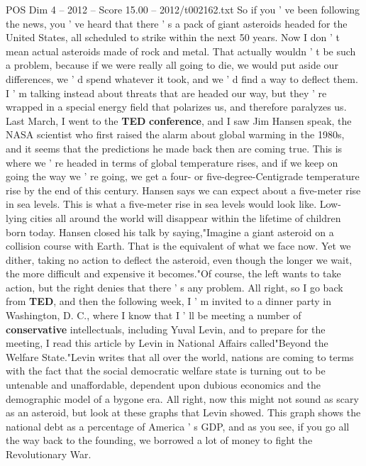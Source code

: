 \begin{textsample}{POS Dim 4 – 2012 – Score 15.00 – 2012/t002162.txt}  \label{ex:f4_pos_072}
So if you ' ve been following the news, you ' ve heard that there ' s a pack of giant asteroids headed for the United States, all scheduled to strike within the next 50 years.
Now I don ' t mean actual asteroids made of rock and metal.
That actually wouldn ' t be such a problem, because if we were really all going to die, we would put aside our differences, we ' d spend whatever it took, and we ' d find a way to deflect them.
I ' m talking instead about threats that are headed our way, but they ' re wrapped in a special energy field that polarizes us, and therefore paralyzes us.
Last March, I went to the \textbf{TED} \textbf{conference}, and I saw Jim Hansen speak, the NASA scientist who first raised the alarm about global warming in the 1980s, and it seems that the predictions he made back then are coming true.
This is where we ' re headed in terms of global temperature rises, and if we keep on going the way we ' re going, we get a four- or five-degree-Centigrade temperature rise by the end of this century.
Hansen says we can expect about a five-meter rise in sea levels.
This is what a five-meter rise in sea levels would look like.
Low- lying cities all around the world will disappear within the lifetime of children born today.
Hansen closed his talk by saying,"Imagine a giant asteroid on a collision course with Earth.
That is the equivalent of what we face now.
Yet we dither, taking no action to deflect the asteroid, even though the longer we wait, the more difficult and expensive it becomes."Of course, the left wants to take action, but the right denies that there ' s any problem.
All right, so I go back from \textbf{TED}, and then the following week, I ' m invited to a dinner party in Washington, D.
C., where I know that I ' ll be meeting a number of \textbf{conservative} intellectuals, including Yuval Levin, and to prepare for the meeting, I read this article by Levin in National Affairs called"Beyond the Welfare State."Levin writes that all over the world, nations are coming to terms with the fact that the social democratic welfare state is turning out to be untenable and unaffordable, dependent upon dubious economics and the demographic model of a bygone era.
All right, now this might not sound as scary as an asteroid, but look at these graphs that Levin showed.
This graph shows the national debt as a percentage of America ' s GDP, and as you see, if you go all the way back to the founding, we borrowed a lot of money to fight the Revolutionary War.

\end{textsample}
